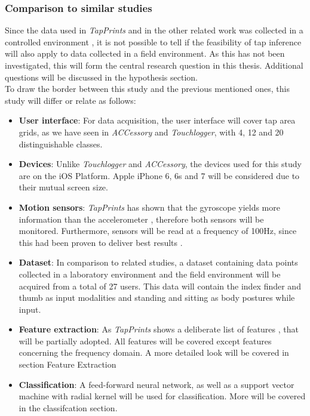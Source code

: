 \subsubsection{Comparison to similar studies}

Since the data used in \textit{TapPrints} and in the other related work was collected in a controlled environment \cite{Accessory,Touchlogger,Tapprints}, it is not possible to tell if the feasibility of tap inference will also apply to data collected in a field environment. As this has not been investigated, this will form the central research question in this thesis. Additional questions will be discussed in the hypothesis section.\\ %

To draw the border between this study and the previous mentioned ones, this study will differ or relate as follows:
\begin{itemize}
  \item \textbf{User interface}: For data acquisition, the user interface will cover tap area grids, as we have seen in \textit{ACCessory} and \textit{Touchlogger}, with 4, 12 and 20 distinguishable classes.
  \item \textbf{Devices}: Unlike \textit{Touchlogger} and \textit{ACCessory}, the devices used for this study are on the iOS Platform. Apple iPhone 6, 6s and 7 will be considered due to their mutual screen size.
  \item \textbf{Motion sensors}: \textit{TapPrints} has shown that the gyroscope yields more information than the accelerometer \cite{Tapprints}, therefore both sensors will be monitored. Furthermore, sensors will be read at a frequency of 100Hz, since this had been proven to deliver best results \cite{Tapprints, Accessory}.
  \item \textbf{Dataset}: In comparison to related studies, a dataset containing data points collected in a laboratory environment and the field environment will be acquired from a total of 27 users. This data will contain the index finder and thumb as input modalities and standing and sitting as body postures while input. 
  \item \textbf{Feature extraction}: As \textit{TapPrints} shows a deliberate list of features \cite{Tapprints}, that will be partially adopted. All features will be covered except features concerning the frequency domain. A more detailed look will be covered in section Feature Extraction
  \item \textbf{Classification}: A feed-forward neural network, as well as a support vector machine with radial kernel will be used for classification. More will be covered in the classifcation section.
\end{itemize}

